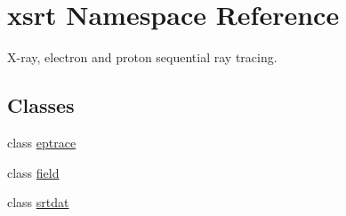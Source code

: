 \hypertarget{namespacexsrt}{}\section{xsrt Namespace Reference}
\label{namespacexsrt}


X-\/ray, electron and proton sequential ray tracing.  


\subsection*{Classes}
\begin{DoxyCompactItemize}
\item 
class \hyperlink{classxsrt_1_1eptrace}{eptrace}
\item 
class \hyperlink{classxsrt_1_1field}{field}
\item 
class \hyperlink{classxsrt_1_1srtdat}{srtdat}
\end{DoxyCompactItemize}
